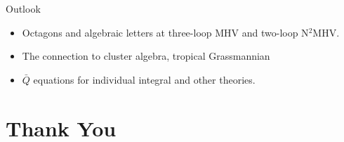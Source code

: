 \documentclass[10pt]{beamer}
\begin{document}

\begin{frame}{Outlook}

\begin{itemize}
  \item Octagons and algebraic letters at three-loop MHV and two-loop N$^{2}$MHV.
  \item The connection to cluster algebra, tropical Grassmannian
  \item $\bar{Q}$ equations for individual integral and other theories.
\end{itemize}


\end{frame}

\section*{Thank You}

\appendix
\iffalse
\only<2> { \item For $k=1$, it's non-trivial, since   
\begin{align*}
\bar{Q} [1,2,3,4,5]\log\frac{\langle1234\rangle}{\langle2345\rangle} &= [1,2,3,4,5]\bar{Q} \log\frac{\langle1234\rangle}{\langle2345\rangle} \\
  &= (\bar{3})_{a} [1,2,3,4,5]\frac{\langle 1234\rangle\chi^{A}_{5}+\text{cyclic}}{\langle2345\rangle\langle 2341\rangle}
\end{align*}}
one example:
\begin{align*}
  Y_{1}^{(2)} \propto \bar{Q}\log u\bar{Q}\log v\bar{Q}\log w
\end{align*}
then it is easy to see that 
\[
\bar{Q}\bigl(Y_{1}^{2}F(u,v,w)\bigr) =0 
\]
for any function $F$ of $u,v,w$.
\fi
\end{document}
